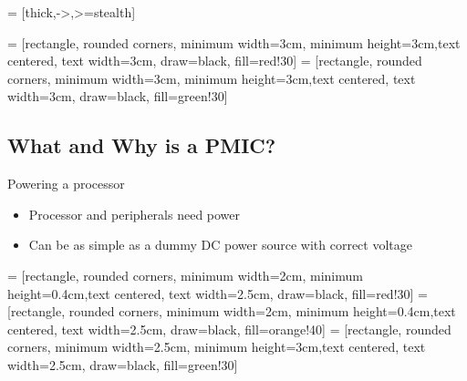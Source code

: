 \documentclass[10pt]{beamer}
\begin{document}

 = [thick,->,>=stealth]

 = [rectangle, rounded corners, minimum width=3cm, minimum height=3cm,text centered, text width=3cm, draw=black, fill=red!30]
 = [rectangle, rounded corners, minimum width=3cm, minimum height=3cm,text centered, text width=3cm, draw=black, fill=green!30]

\addtocounter{framenumber}{-1}
\begin{frame}[plain]
\section{What and Why is a PMIC?}
\end{frame}

\begin{frame}[t]{Powering a processor}\vspace{4pt}

\begin{itemize}
	\item Processor and peripherals need power
	\item Can be as simple as a dummy DC power source with correct voltage
\end{itemize}


\vfill
\centering
\begin{minipage}[c]{.75\textwidth}

\end{minipage}
\end{frame}


 = [rectangle, rounded corners, minimum width=2cm, minimum height=0.4cm,text centered, text width=2.5cm, draw=black, fill=red!30]
 = [rectangle, rounded corners, minimum width=2cm, minimum height=0.4cm,text centered, text width=2.5cm, draw=black, fill=orange!40]
 = [rectangle, rounded corners, minimum width=2.5cm, minimum height=3cm,text centered, text width=2.5cm, draw=black, fill=green!30]
\end{document}
